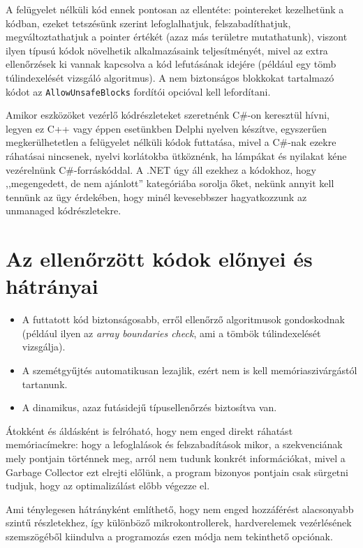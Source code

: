 \documentclass[tocnopagenum]{thesis-ekf}
\theoremstyle{definition}
\theoremstyle{remark}
\begin{document}
	A felügyelet nélküli kód ennek pontosan az ellentéte: pointereket kezelhetünk a kódban, ezeket tetszésünk szerint lefoglalhatjuk, felszabadíthatjuk, megváltoztathatjuk a pointer értékét (azaz más területre mutathatunk), viszont ilyen típusú kódok növelhetik alkalmazásaink teljesítményét, mivel az extra ellenőrzések ki vannak kapcsolva a kód lefutásának idejére (például egy tömb túlindexelését vizsgáló algoritmus).
	A nem biztonságos blokkokat tartalmazó kódot az \verb*|AllowUnsafeBlocks| fordítói opcióval kell lefordítani.
	
	Amikor eszközöket vezérlő kódrészleteket szeretnénk C\#-on keresztül hívni, legyen ez C++ vagy éppen esetünkben Delphi nyelven készítve, egyszerűen megkerülhetetlen a felügyelet nélküli kódok futtatása, mivel a C\#-nak ezekre ráhatásai nincsenek, nyelvi korlátokba ütköznénk, ha lámpákat és nyilakat kéne vezérelnünk C\#-forráskóddal. A .NET úgy áll ezekhez a kódokhoz, hogy ,,megengedett, de nem ajánlott'' kategóriába sorolja őket, nekünk annyit kell tennünk az ügy érdekében, hogy minél kevesebbszer hagyatkozzunk az unmanaged kódrészletekre.
	\cite{sof_managed}
	\section{Az ellenőrzött kódok előnyei és hátrányai}
	\begin{itemize}
		\item A futtatott kód biztonságosabb, erről ellenőrző algoritmusok gondoskodnak (például ilyen az \textit{array boundaries check}, ami a tömbök túlindexelését vizsgálja).
		\item A szemétgyűjtés automatikusan lezajlik, ezért nem is kell memóriaszivárgástól tartanunk.
		\item A dinamikus, azaz futásidejű típusellenőrzés biztosítva van.
	\end{itemize}
	
	Átokként és áldásként is felróható, hogy nem enged direkt ráhatást memóriacímekre: hogy a lefoglalások és felszabadítások mikor, a szekvenciának mely pontjain történnek meg, arról nem tudunk konkrét információkat, mivel a Garbage Collector ezt elrejti előlünk, a program bizonyos pontjain csak sürgetni tudjuk, hogy az optimalizálást előbb végezze el. 
	
	Ami ténylegesen hátrányként említhető, hogy nem enged hozzáférést alacsonyabb szintű részletekhez, így különböző mikrokontrollerek, hardverelemek vezérlésének szemszögéből kiindulva a programozás ezen módja nem tekinthető opciónak.
\end{document}
